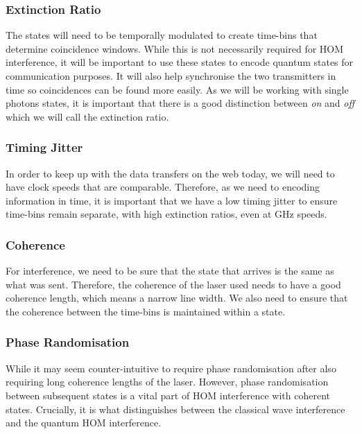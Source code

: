 \subsubsection*{Extinction Ratio}

The states will need to be temporally modulated to create time-bins that determine coincidence windows. While this is not necessarily required for \ac{HOM} interference, it will be important to use these states to encode quantum states for communication purposes. It will also help synchronise the two transmitters in time so coincidences can be found more easily. As we will be working with single photons states, it is important that there is a good distinction between \textit{on} and \textit{off} which we will call the extinction ratio. 

\subsubsection*{Timing Jitter}

In order to keep up with the data transfers on the web today, we will need to have clock speeds that are comparable. Therefore, as we need to encoding information in time, it is important that we have a low timing jitter to ensure time-bins remain separate, with high extinction ratios, even at GHz speeds.

\subsubsection*{Coherence}

For interference, we need to be sure that the state that arrives is the same as what was sent. Therefore, the coherence of the laser used needs to have a good coherence length, which means a narrow line width. We also need to ensure that the coherence between the time-bins is maintained within a state.

\subsubsection*{Phase Randomisation}

While it may seem counter-intuitive to require phase randomisation after also requiring long coherence lengths of the laser. However, phase randomisation between subsequent states is a vital part of \ac{HOM} interference with coherent states. Crucially, it is what distinguishes between the classical wave interference and the quantum \ac{HOM} interference.

